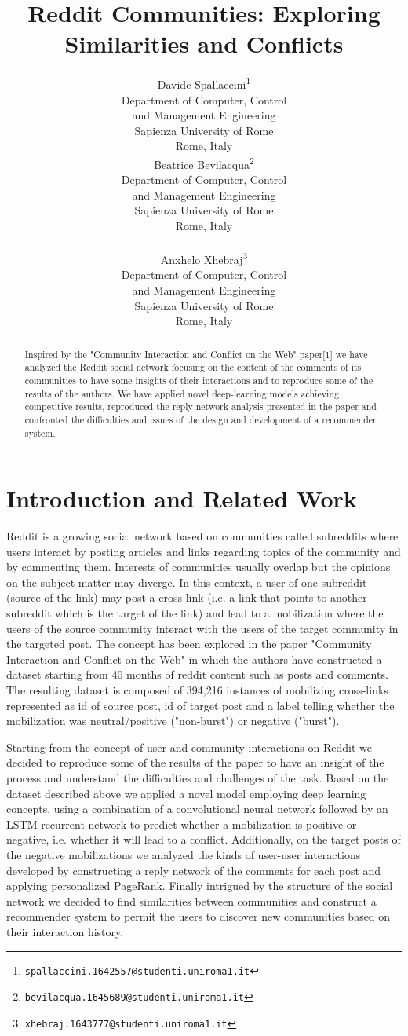 \documentclass{article}
\title{Reddit Communities: Exploring Similarities and Conflicts}
\author{
  Davide Spallaccini\thanks{\texttt{spallaccini.1642557@studenti.uniroma1.it}} \\
  Department of Computer, Control \\ and Management Engineering\\
  Sapienza University of Rome\\
  Rome, Italy \\
  \And
  Beatrice Bevilacqua\thanks{\texttt{bevilacqua.1645689@studenti.uniroma1.it}} \\
  Department of Computer, Control \\ and Management Engineering\\
  Sapienza University of Rome\\
  Rome, Italy \\
   \\
  \And
  Anxhelo Xhebraj\thanks{\texttt{xhebraj.1643777@studenti.uniroma1.it}} \\
  Department of Computer, Control \\ and Management Engineering\\
  Sapienza University of Rome\\
  Rome, Italy
}
\begin{document}

\maketitle

\begin{abstract}

  Inspired by the "Community Interaction and Conflict on the Web"
  paper[1] we have analyzed the Reddit social network focusing
  on the content of the comments of its communities to have some insights of
  their interactions and to reproduce some of the results of the authors. We
  have applied novel deep-learning models achieving competitive results,
  reproduced the reply network analysis presented in the paper and confronted
  the difficulties and issues of the design and development of a recommender
  system.

\end{abstract}

\section{Introduction and Related Work}
\label{sec:intro}

Reddit is a growing social network based on communities called
subreddits where users interact by posting articles and links regarding
topics of the community and by commenting them. Interests of communities usually
overlap but the
opinions on the subject matter may diverge. In this context, a user of one
subreddit (source of the link) may post a cross-link (i.e. a link that
points to another subreddit which is the target of the link) and lead to
a mobilization where the users of the source community interact with the users
of the target community in the targeted post. The concept has been explored in
the paper "Community Interaction and Conflict on the Web" in which the authors
have constructed a dataset starting from 40 months of reddit content such as
posts and comments. The resulting dataset is composed of 394,216 instances of
mobilizing cross-links represented as id of source post, id of target post
and a label telling whether the mobilization was neutral/positive ("non-burst")
or negative ("burst").

Starting from the concept of user and community interactions on Reddit we
decided to reproduce some of the results of the paper to have an insight of the
process and understand the difficulties and challenges of the task. Based on the
dataset described above we applied a novel model employing deep learning
concepts,
using a combination of a convolutional neural network followed by an LSTM
recurrent network to predict whether a mobilization is positive or negative,
i.e. whether it will lead to a conflict. Additionally, on the target posts of
the negative mobilizations we analyzed the kinds of user-user interactions
developed by constructing a reply network of the comments for each post and 
applying personalized PageRank. Finally intrigued by the structure of the social
network we decided to find similarities between communities and construct a
recommender system to permit the users to discover new communities based on
their interaction history.
\end{document}

